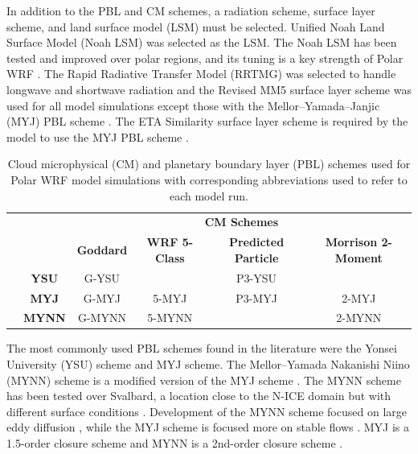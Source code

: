 In addition to the PBL and CM schemes, a radiation scheme, surface layer scheme, and land surface model (LSM) must be selected. Unified Noah Land Surface Model (Noah LSM) was selected as the LSM. The Noah LSM has been tested and improved over polar regions, and its tuning is a key strength of Polar WRF \citep{mukul:2004, hines:2015, tewari:2004}. The Rapid Radiative Transfer Model (RRTMG) was selected to handle longwave and shortwave radiation \citep{mlawer:1997} and the Revised MM5 surface layer scheme was used for all model simulations except those with the Mellor–Yamada–Janjic (MYJ) PBL scheme \citep{jimenez:2012}. The ETA Similarity surface layer scheme is required by the model to use the MYJ PBL scheme \citep{janic:2001}. 

\begin{table}[t]
\doublespacing
\centering
\footnotesize
{\begin{tabular}{| c | c | c | c | c | c |}
  \hline
 \rowcolor[HTML]{F3F3F3} & & \multicolumn{4}{c|}{\textbf{CM Schemes}} \\
 \rowcolor[HTML]{F3F3F3} & & \textbf{Goddard} & \textbf{WRF 5-Class} & \textbf{Predicted Particle} & \textbf{Morrison 2-Moment} \\
  \hline
\cellcolor[HTML]{F3F3F3}
 &\textbf{YSU} & G-YSU & & P3-YSU & \\
\cellcolor[HTML]{F3F3F3}  & \textbf{MYJ} & G-MYJ & 5-MYJ & P3-MYJ & 2-MYJ \\ 
\cellcolor[HTML]{F3F3F3}  \parbox[t]{3mm}{} \parbox[t]{2mm}{} & \textbf{MYNN} & G-MYNN & 5-MYNN & & 2-MYNN \\
  \hline
\end{tabular}}
\caption[Cloud microphysics and planetary boundary layer schemes used in polar WRF simulations.]{Cloud microphysical (CM) and planetary boundary layer (PBL) schemes used for Polar WRF model simulations with corresponding abbreviations used to refer to each model run.}
\label{tab:schemes}
\end{table}

The most commonly used PBL schemes found in the literature were the Yonsei University (YSU) scheme \citep{hong:2004} and MYJ scheme. The Mellor–Yamada Nakanishi Niino (MYNN) scheme \citep{olson:2019} is a modified version of the MYJ scheme \citep{mesinger:1993}. The MYNN scheme has been tested over Svalbard, a location close to the N-ICE domain but with different surface conditions \citep{pilguj:2018}. Development of the MYNN scheme focused on large eddy diffusion \citep{cohen:2015}, while the MYJ scheme is focused more on stable flows \citep{janjic:1994, mellor:1982}. MYJ is a 1.5-order closure scheme and MYNN is a 2nd-order closure scheme \citep{pilguj:2018}.

